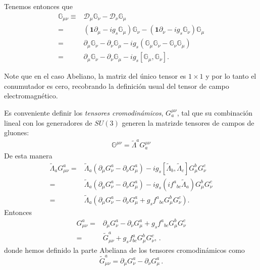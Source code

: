 \begin{frame}
Tenemos entonces que %
\begin{align}
  \mathbb{G}_{\mu\nu}\equiv & \mathcal{D}_{\mu} \mathbb{G}_{\nu}-\mathcal{D}_{\nu} \mathbb{G}_{\mu} \nonumber\\
=&\left( \mathbf{1}\partial_{\mu}-i g_s \mathbb{G}_{\mu} \right)\mathbb{G}_{\nu}-
\left( \mathbf{1}\partial_{\nu}-i g_s \mathbb{G}_{\nu} \right)\mathbb{G}_{\mu}\nonumber\\
=& \partial_{\mu}\mathbb{G}_{\nu}-\partial_{\nu}\mathbb{G}_{\mu}
-ig_s \left(  \mathbb{G}_{\mu}\mathbb{G}_{\nu}-\mathbb{G}_{\nu}\mathbb{G}_{\mu}  \right) \nonumber\\
=& \partial_{\mu}\mathbb{G}_{\nu}-\partial_{\nu}\mathbb{G}_{\mu}
-ig_s \left[  \mathbb{G}_{\mu},\mathbb{G}_{\nu}  \right] .
\end{align}
\end{frame}
Note que en el caso Abeliano, la matriz del único tensor es $1\times1$ y por lo tanto el conumutador es cero, recobrando la definición usual del tensor de campo electromagnético.

\begin{frame}
Es conveniente definir los \emph{tensores cromodinámicos}, $G^{\mu\nu}_a$, tal que su combinación lineal con los generadores de $SU(3)$ generen la matrizde tensores de campos de gluones:
\begin{align}
\label{eq:Gmunu}
\mathbb{G}^{\mu\nu}=\widetilde{\Lambda}^aG^{\mu\nu}_a
\end{align}
De esta manera
\begin{align}
  \widetilde{\Lambda}_a G_{\mu\nu}^a=& \widetilde{\Lambda}_a
\left( \partial_{\mu}G_{\nu}^{a}-\partial_{\nu}G_{\mu}^{a}  \right)
-i g_s \left[ \widetilde{\Lambda}_b,\widetilde{\Lambda}_c \right]G_{\mu}^{b}G_{\nu}^{c} \nonumber\\
=&\widetilde{\Lambda}_a
\left( \partial_{\mu}G_{\nu}^{a}-\partial_{\nu}G_{\mu}^{a}  \right)
-i g_s \left(i {f^{a}}_{bc} \widetilde{\Lambda}_a \right)G_{\mu}^{b}G_{\nu}^{c} \nonumber\\
=&\widetilde{\Lambda}_a \left(  \partial_{\mu}G_{\nu}^{a}-\partial_{\nu}G_{\mu}^{a} 
+g_s  {f^{a}}_{bc} G_{\mu}^{b}G_{\nu}^{c}\right).
\end{align}
Entonces
\begin{align}
  \label{eq:258qft}
  G_{\mu\nu}^a=&\partial_{\mu}G_{\nu}^{a}-\partial_{\nu}G_{\mu}^{a}+
g_s{f^{a}}_{bc}G_{\mu}^{b}G_{\nu}^{c} \nonumber\\
=&\widetilde{G}_{\mu\nu}^a+g_s f^a_{bc}G_\mu^b G_\nu^c,\,.
\end{align}
donde hemos definido la parte Abeliana de los tensores cromodinámicos como
\begin{equation}
  \widetilde{G}_{\mu\nu}^a=\partial_\mu G_\nu^a-\partial_\nu G_\mu^a\,.
\end{equation}
\end{frame}


